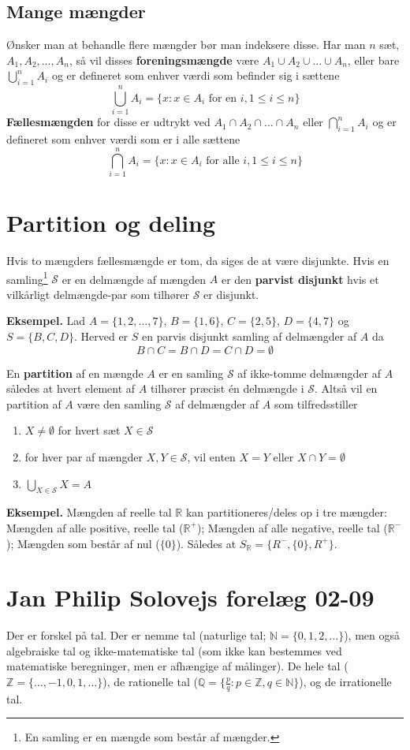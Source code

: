 \subsection{Mange mængder}
Ønsker man at behandle flere mængder bør man indeksere disse. Har man $n$ sæt, $A_1, A_2, \ldots, A_n$, så vil disses \textbf{foreningsmængde} være $A_1\cup A_2\cup \ldots \cup A_n$, eller bare $\bigcup_{i=1}^n A_i$ og er defineret som enhver værdi som befinder sig i sættene\[\bigcup_{i=1}^n A_i = \{x:x\in A_i \text{ for en } i, 1\leq i\leq n\}\]
\textbf{Fællesmængden} for disse er udtrykt ved $A_1\cap A_2\cap\ldots\cap A_n$ eller $\bigcap_{i=1}^n A_i$ og er defineret som enhver værdi som er i alle sættene\[\bigcap_{i=1}^n A_i=\{x:x\in A_i \text{ for alle } i, 1\leq i\leq n\}\]
\section{Partition og deling}
Hvis to mængders fællesmængde er tom, da siges de at være disjunkte. Hvis en samling\footnote{En samling er en mængde som består af mængder.} $\mathcal{S}$ er en delmængde af mængden $A$ er den \textbf{parvist disjunkt} hvis et vilkårligt delmængde-par som tilhører $\mathcal{S}$ er disjunkt.\par\textbf{Eksempel.} Lad $A=\{1,2,\ldots,7\}$, $B=\{1,6\}$, $C=\{2,5\}$, $D=\{4,7\}$ og $S=\{B,C,D\}$. Herved er $S$ en parvis disjunkt samling af delmængder af $A$ da\[B\cap C=B\cap D=C\cap D=\emptyset\]\par
En \textbf{partition} af en mængde $A$ er en samling $\mathcal{S}$ af ikke-tomme delmængder af $A$ således at hvert element af $A$ tilhører præcist én delmængde i $\mathcal{S}$. Altså vil en partition af $A$ være den samling $\mathcal{S}$ af delmængder af $A$ som tilfredsstiller
\begin{enumerate}
    \item $X\neq\emptyset$ for hvert sæt $X\in\mathcal{S}$
    \item for hver par af mængder $X,Y\in\mathcal{S}$, vil enten $X=Y$ eller $X\cap Y=\emptyset$
    \item $\bigcup_{X\in\mathcal{S}}X=A$
\end{enumerate}\par\textbf{Eksempel.} Mængden af reelle tal $\mathbb{R}$ kan partitioneres/deles op i tre mængder: Mængden af alle positive, reelle tal ($\mathbb{R}^+$); Mængden af alle negative, reelle tal ($\mathbb{R}^-$); Mængden som består af nul ($\{0\}$). Således at $S_\mathbb{R}=\{R^-, \{0\}, R^+\}$.
\section{Jan Philip Solovejs forelæg 02-09}
Der er forskel på tal. Der er nemme tal (naturlige tal; $\mathbb{N}=\lbrace0,1,2,\ldots\rbrace$), men også algebraiske tal og ikke-matematiske tal (som ikke kan bestemmes ved matematiske beregninger, men er afhængige af målinger). De hele tal ($\mathbb{Z}=\lbrace\ldots,-1,0,1,\ldots\rbrace$), de rationelle tal ($\mathbb{Q}=\lbrace\frac{p}{q}:p\in \mathbb{Z},q\in\mathbb{N}\rbrace$), og de irrationelle tal.

